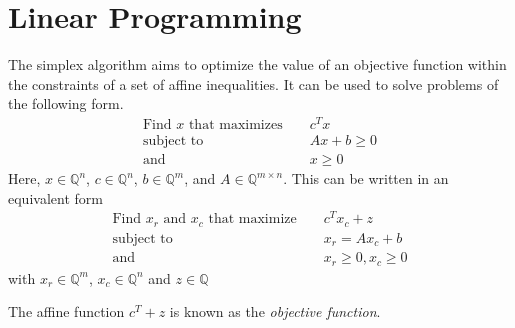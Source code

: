 \documentclass[11pt]{article} %
\begin{document}
\section{Linear Programming}
The simplex algorithm aims to optimize the value of an objective function within the constraints of a set of affine inequalities. It can be used to solve problems of the following form.
\begin{equation}
  \begin{aligned}
    \text{Find } x \text{ that maximizes } && c^Tx \\
    \text{subject to } && A x + b \ge 0\\
    \text{and } && x \ge 0
  \end{aligned}
\end{equation}
Here, $x \in \mathbb{Q}^n$, $c \in \mathbb{Q}^n$, $b \in \mathbb{Q}^m$, and $A \in \mathbb{Q}^{m \times n}$.
This can be written in an equivalent form 
\begin{equation}
  \begin{aligned}
    \text{Find } x_r \text{ and } x_c \text{ that maximize } && c^Tx_c + z \\
    \text{subject to } && x_r = A x_c + b \\
    \text{and } && x_r \ge 0, x_c \ge 0
  \end{aligned}
\end{equation}
with $x_r \in \mathbb{Q}^m$, $x_c \in \mathbb{Q}^n$ and $z \in \mathbb{Q}$

The affine function $c^T+z$ is known as the \textit{objective function}.
\end{document}
